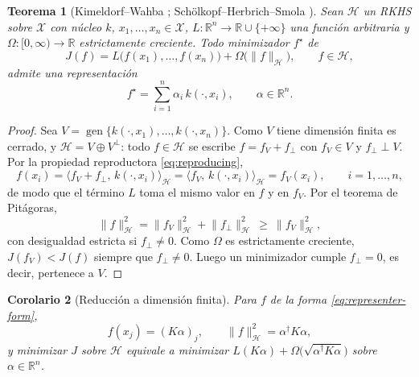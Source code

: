 \documentclass[11pt,a4paper]{article}
\newcommand{\R}{\mathbb{R}}
\newcommand{\X}{\mathcal{X}}
\newcommand{\Hk}{\mathcal{H}}
\newcommand{\dg}{\dagger}                         %
\newcommand{\inner}[2]{\langle #1,\, #2\rangle}
\newcommand{\norm}[1]{\lVert #1\rVert}
\DeclareMathOperator{\gen}{gen}
\theoremstyle{plain}
\newtheorem{teorema}{Teorema}[section]
\newtheorem{corolario}[teorema]{Corolario}
\theoremstyle{definition}
\theoremstyle{remark}
\numberwithin{equation}{section}
\begin{document}
\begin{teorema}[Kimeldorf--Wahba \cite{kimeldorf1971}; Schölkopf--Herbrich--Smola
\cite{scholkopf2001}]\label{teo:representante}
Sean $\Hk$ un RKHS sobre $\X$ con núcleo $k$, $x_1,\dots,x_n\in\X$,
$L\colon\R^n\to\R\cup\{+\infty\}$ una función arbitraria y $\Omega\colon[0,\infty)\to\R$
estrictamente creciente. Todo minimizador $f^\star$ de
\begin{equation}\label{eq:representer-objective}
  J(f)=L\bigl(f(x_1),\dots,f(x_n)\bigr)+\Omega\bigl(\norm{f}_{\Hk}\bigr),\qquad f\in\Hk,
\end{equation}
admite una representación
\begin{equation}\label{eq:representer-form}
  f^\star=\sum_{i=1}^n\alpha_i\,k(\cdot,x_i),\qquad\alpha\in\R^n .
\end{equation}
\end{teorema}
\begin{proof}
Sea $V=\gen\{k(\cdot,x_1),\dots,k(\cdot,x_n)\}$. Como $V$ tiene dimensión finita es cerrado,
y $\Hk=V\oplus V^{\perp}$: todo $f\in\Hk$ se escribe $f=f_V+f_\perp$ con $f_V\in V$ y
$f_\perp\perp V$. Por la propiedad reproductora \eqref{eq:reproducing},
\begin{equation}\label{eq:representer-eval}
  f(x_i)=\inner{f_V+f_\perp}{k(\cdot,x_i)}_{\Hk}=\inner{f_V}{k(\cdot,x_i)}_{\Hk}=f_V(x_i),
  \qquad i=1,\dots,n,
\end{equation}
de modo que el término $L$ toma el mismo valor en $f$ y en $f_V$. Por el teorema de Pitágoras,
\begin{equation}\label{eq:representer-norm}
  \norm{f}_{\Hk}^2=\norm{f_V}_{\Hk}^2+\norm{f_\perp}_{\Hk}^2\ \ge\ \norm{f_V}_{\Hk}^2,
\end{equation}
con desigualdad estricta si $f_\perp\ne0$. Como $\Omega$ es estrictamente creciente,
$J(f_V)<J(f)$ siempre que $f_\perp\ne0$. Luego un minimizador cumple $f_\perp=0$, es decir,
pertenece a $V$.
\end{proof}

\begin{corolario}[Reducción a dimensión finita]\label{cor:finito}
Para $f$ de la forma \eqref{eq:representer-form},
\begin{equation}\label{eq:rkhs-norm-gram}
  f(x_j)=(K\alpha)_j,\qquad\norm{f}_{\Hk}^2=\alpha^{\dg}K\alpha ,
\end{equation}
y minimizar $J$ sobre $\Hk$ equivale a minimizar
$L(K\alpha)+\Omega\bigl(\sqrt{\alpha^{\dg}K\alpha}\bigr)$ sobre $\alpha\in\R^n$.
\end{corolario}
\end{document}
